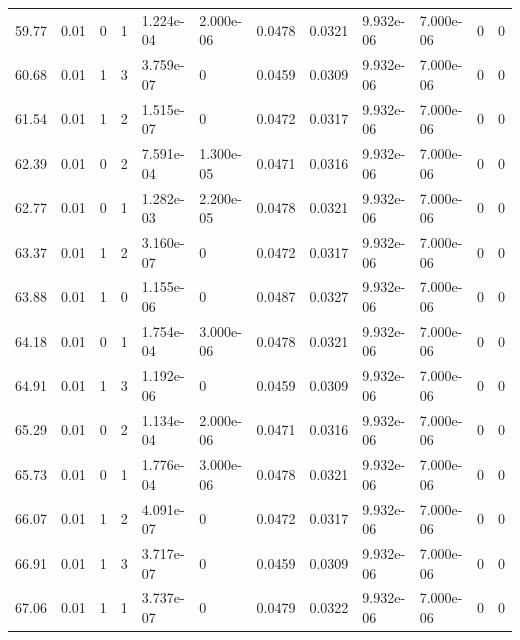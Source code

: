 \documentclass[preview]{standalone}
\begin{document}
{{{\begin{tabular}{L{1.2cm}C{1.2cm} C{0.3cm}C{0.5cm} C{1.4cm}C{1.4cm} C{1.4cm}C{1.4cm} C{1.6cm}C{1.6cm} C{1.6cm}C{1.6cm}}
  59.77  &  0.01  & 0     &  1 &  1.224e-04  & 2.000e-06  &  0.0478&   0.0321& 9.932e-06 & 7.000e-06   &  0 & 0  \\ 
  60.68  &  0.01  & 1     &  3 &  3.759e-07  & 0  &  0.0459&   0.0309& 9.932e-06 & 7.000e-06   &  0 & 0  \\ 
  61.54  &  0.01  & 1     &  2 &  1.515e-07  & 0  &  0.0472&   0.0317& 9.932e-06 & 7.000e-06   &  0 & 0  \\ 
  62.39  &  0.01  & 0     &  2 &  7.591e-04  & 1.300e-05  &  0.0471&   0.0316& 9.932e-06 & 7.000e-06   &  0 & 0  \\ 
  62.77  &  0.01  & 0     &  1 &  1.282e-03  & 2.200e-05  &  0.0478&   0.0321& 9.932e-06 & 7.000e-06   &  0 & 0  \\ 
  63.37  &  0.01  & 1     &  2 &  3.160e-07  & 0  &  0.0472&   0.0317& 9.932e-06 & 7.000e-06   &  0 & 0  \\ 
  63.88  &  0.01  & 1     &  0 &  1.155e-06  & 0  &  0.0487&   0.0327& 9.932e-06 & 7.000e-06   &  0 & 0  \\ 
  64.18  &  0.01  & 0     &  1 &  1.754e-04  & 3.000e-06  &  0.0478&   0.0321& 9.932e-06 & 7.000e-06   &  0 & 0  \\ 
  64.91  &  0.01  & 1     &  3 &  1.192e-06  & 0  &  0.0459&   0.0309& 9.932e-06 & 7.000e-06   &  0 & 0  \\ 
  65.29  &  0.01  & 0     &  2 &  1.134e-04  & 2.000e-06  &  0.0471&   0.0316& 9.932e-06 & 7.000e-06   &  0 & 0  \\ 
  65.73  &  0.01  & 0     &  1 &  1.776e-04  & 3.000e-06  &  0.0478&   0.0321& 9.932e-06 & 7.000e-06   &  0 & 0  \\ 
  66.07  &  0.01  & 1     &  2 &  4.091e-07  & 0  &  0.0472&   0.0317& 9.932e-06 & 7.000e-06   &  0 & 0  \\ 
  66.91  &  0.01  & 1     &  3 &  3.717e-07  & 0  &  0.0459&   0.0309& 9.932e-06 & 7.000e-06   &  0 & 0  \\ 
  67.06  &  0.01  & 1     &  1 &  3.737e-07  & 0  &  0.0479&   0.0322& 9.932e-06 & 7.000e-06   &  0 & 0  \\ 
\hline 
\end{tabular} 

}}}
\end{document}
